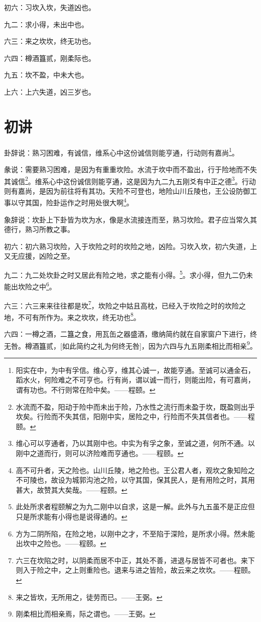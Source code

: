 \documentclass[12pt,oneside]{book}
\begin{document}
初六：习坎入坎，失道凶也。

九二：求小得，未出中也。

六三：来之坎坎，终无功也。

六四：樽酒簋贰，刚柔际也。

九五：坎不盈，中未大也。

上六：上六失道，凶三岁也。

\section{初讲}
卦辞说：熟习困难，有诚信，维系心中这份诚信则能亨通，行动则有嘉尚\footnote{阳实在中，为中有孚信。维心亨，维其心诚一，故能亨通。至诚可以通金石，蹈水火，何险难之不可亨也。行有尚，谓以诚一而行，则能出险，有可嘉尚，谓有功也。不行则常在险中矣。——程颐。}。

彖说：需要熟习困难，是因为有重重坎险。水流于坎中而不盈出，行于险地而不失其诚信\footnote{水流而不盈，阳动于险中而未出于险，乃水性之流行而未盈于坎，既盈则出乎坎矣。行险而不失其信，阳刚中实，居险之中，行险而不失其信者也。——程颐。}。维系心中这份诚信则能亨通，这是因为九二九五刚爻有中正之德\footnote{维心可以亨通者，乃以其刚中也。中实为有孚之象，至诚之道，何所不通。以刚中之道而行，则可以济险难而亨通也。——程颐。}。行动则有嘉尚，是因为前往将有其功。天险不可登也，地险山川丘陵也，王公设防御工事以守其国，险卦运作之时用处很大啊\footnote{高不可升者，天之险也。山川丘陵，地之险也。王公君人者，观坎之象知险之不可陵也，故设为城郭沟池之险，以守其国，保其民人，是有用险之时，其用甚大，故赞其大矣哉。——程颐。}。

象辞说：坎卦上下卦皆为坎为水，像是水流接连而至，熟习坎险。君子应当常久其德行，熟习所教之事。

初六：初六熟习坎险，入于坎险之时的坎险之地，凶险。习坎入坎，初六失道，上又无应援，凶险之至。

九二：九二处坎卦之时又居此有险之地，求之能有小得。\footnote{此处所求者程颐解之为九二刚中以自求，这是一解。此外与九五虽不是正应但只是所求能有小得也是说得通的。}。求小得，但九二仍未能出坎险之中\footnote{方为二阴所陷，在险之地，以刚中之才，不至陷于深险，是所求小得。然未能出坎中之险也。——程颐。}。

六三：六三来来往往都是坎\footnote{六三在坎陷之时，以阴柔而居不中正，其处不善，进退与居皆不可者也。来下则入于险之中，之上则重险也。退来与进之皆险，故云来之坎坎。——程颐。}，坎险之中姑且高枕，已经入于坎险之时的坎险之地，不可有所作为。来之坎坎，终无功也\footnote{来之皆坎，无所用之，徒劳而已。——王弼。}。

六四：一樽之酒，二簋之食，用瓦缶之器盛酒，缴纳简约就在自家窗户下进行，终无咎。樽酒簋贰，[如此简约之礼为何终无咎]，因为六四与九五刚柔相比而相亲\footnote{刚柔相比而相亲焉，际之谓也。——王弼。}。
\end{document}
